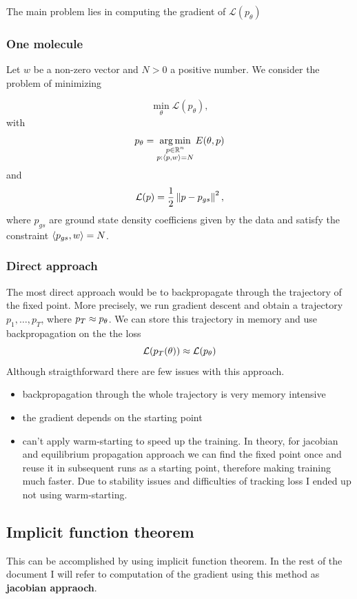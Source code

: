 \documentclass[a4paper,10pt]{report}
\begin{document}
The main problem lies in computing the gradient of $\mathcal{L}(p_\theta)$


\subsubsection{One molecule}
Let $w$ be a non-zero vector and $N>0$ a positive number.
We consider the problem of minimizing

\begin{equation}
 \min_\theta \mathcal{L}(p_\theta),
\end{equation}
with
\begin{equation}
p_\theta = \operatorname*{arg\,min}_{\substack{p \in \mathbb{R}^n \\ p: \langle p, w \rangle=N }} E(\theta, p)
\end{equation}
and
\begin{equation}
 \mathcal{L}(p) = \frac{1}{2} \left\|p-p_{gs}\right\|^2,
\end{equation}
where $p_{gs}$ are ground state density coefficiens given by the data and satisfy the constraint $\langle p_{gs}, w \rangle = N$.


\subsubsection{Direct approach}
The most direct approach would be to backpropagate through the trajectory of the fixed point. More precisely, we run gradient descent and obtain a trajectory $p_1, \ldots, p_T$, where $p_T \approx p_\theta$. We can store this trajectory in memory and use backpropagation on the the loss
\begin{equation}
 \mathcal{L}(p_T(\theta)) \approx \mathcal{L}(p_\theta)
\end{equation}
Although straigthforward there are few issues with this approach.
\begin{itemize}
 \item backpropagation through the whole trajectory is very memory intensive
 \item the gradient depends on the starting point
 \item can't apply warm-starting to speed up the training. In theory, for jacobian and equilibrium propagation approach we can find the fixed point once and reuse it in subsequent runs as a starting point, therefore making training much faster.
 Due to stability issues and difficulties of tracking loss I ended up not using warm-starting.
\end{itemize}

\subsection{Implicit function theorem}
This can be accomplished by using implicit function theorem. In the rest of the document I will refer to computation of the gradient using this method as \textbf{jacobian appraoch}.
\end{document}
